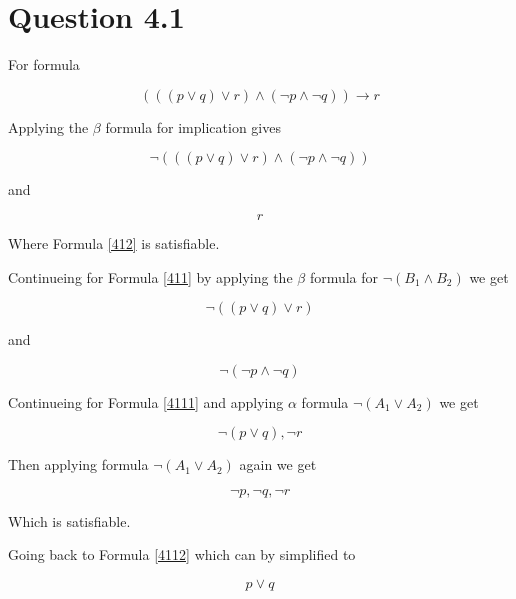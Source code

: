 \documentclass[10pt,a4paper]{article}
\begin{document}
\section{Question 4.1}
For formula

\begin{equation}
\label{41}
 ((( p \vee q) \vee r ) \wedge ( \neg p \wedge \neg q )) \rightarrow r
\end{equation}

Applying the $\beta$ formula for implication gives

\begin{equation}
\label{411}
 \neg  ((( p \vee q) \vee r ) \wedge ( \neg p \wedge \neg q ))
\end{equation}

and

\begin{equation}
\label{412}
 r
\end{equation}

Where Formula \ref{412} is satisfiable.

Continueing for Formula \ref{411} by applying the $\beta$ formula for $\neg (B_1 \wedge B_2)$ we get



 \begin{equation}
 \label{4111}
  \neg (( p \vee q ) \vee r )
 \end{equation}

 and 
 
 \begin{equation}
 \label{4112}
  \neg ( \neg p \wedge \neg q )
 \end{equation}


Continueing for Formula \ref{4111} and applying $\alpha$ formula $\neg ( A_1 \vee A_2 )$ we get

\begin{equation}
\label{41111}
 \neg (p \vee q), \neg r 
\end{equation}

Then applying formula $\neg ( A_1 \vee A_2 )$ again we get

\begin{equation}
\label{411111}
 \neg p, \neg q, \neg r
\end{equation}

Which is satisfiable.

Going back to Formula \ref{4112} which can by simplified to 

\begin{equation}
 p \vee q
\end{equation}
\end{document}
